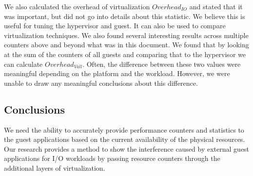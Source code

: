 We also calculated the overhead of virtualization $Overhead_{IO}$ and stated that it was important, but did not go into details about this statistic.  We believe this is useful for tuning the hypervisor and guest.  It can also be used to compare virtualization techniques.  We also found several interesting results across multiple counters above and beyond what was in this document.  We found that by looking at the sum of the counters of all guests and comparing that to the hypervisor we can calculate $Overhead_{Vall}$.  Often, the difference between these two values were meaningful depending on the platform and the workload.  However, we were unable to draw any meaningful conclusions about this difference. 


\subsection{Conclusions}
We need the ability to accurately provide performance counters and statistics to the guest applications based on the current availability of the physical resources.  Our research provides a method to show the interference caused by external guest applications for I/O workloads by passing resource counters through the additional layers of virtualization.    
